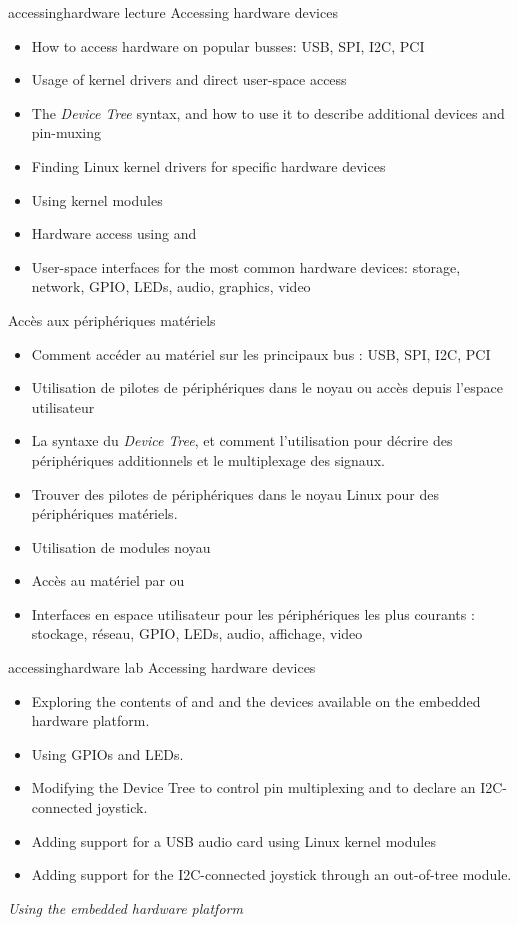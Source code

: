 {accessinghardware}
{lecture}
{Accessing hardware devices}
{
  \begin{itemize}
  \item How to access hardware on popular busses: USB, SPI, I2C, PCI
  \item Usage of kernel drivers and direct user-space access
  \item The {\em Device Tree} syntax, and how to use it to describe
    additional devices and pin-muxing
  \item Finding Linux kernel drivers for specific hardware devices
  \item Using kernel modules
  \item Hardware access using  and 
  \item User-space interfaces for the most common hardware devices:
    storage, network, GPIO, LEDs, audio, graphics, video
  \end{itemize}
}
{Accès aux périphériques matériels}
{
  \begin{itemize}
  \item Comment accéder au matériel sur les principaux bus : USB, SPI,
    I2C, PCI
  \item Utilisation de pilotes de périphériques dans le noyau ou accès
    depuis l'espace utilisateur
  \item La syntaxe du {\em Device Tree}, et comment l'utilisation pour
    décrire des périphériques additionnels et le multiplexage des
    signaux.
  \item Trouver des pilotes de périphériques dans le noyau Linux pour
    des périphériques matériels.
  \item Utilisation de modules noyau
  \item Accès au matériel par  ou 
  \item Interfaces en espace utilisateur pour les périphériques les
    plus courants : stockage, réseau, GPIO, LEDs, audio, affichage,
    video
  \end{itemize}
}
{accessinghardware}
{lab}
{Accessing hardware devices}
{
  \begin{itemize}
  \item Exploring the contents of  and  and the
    devices available on the embedded hardware platform.
  \item Using GPIOs and LEDs.
  \item Modifying the Device Tree to control pin multiplexing and
        to declare an I2C-connected joystick.
  \item Adding support for a USB audio card using Linux kernel modules
  \item Adding support for the I2C-connected joystick through
        an out-of-tree module.
  \end{itemize}

  \vspace{0.5cm}
  {\em Using the embedded hardware platform}
}
